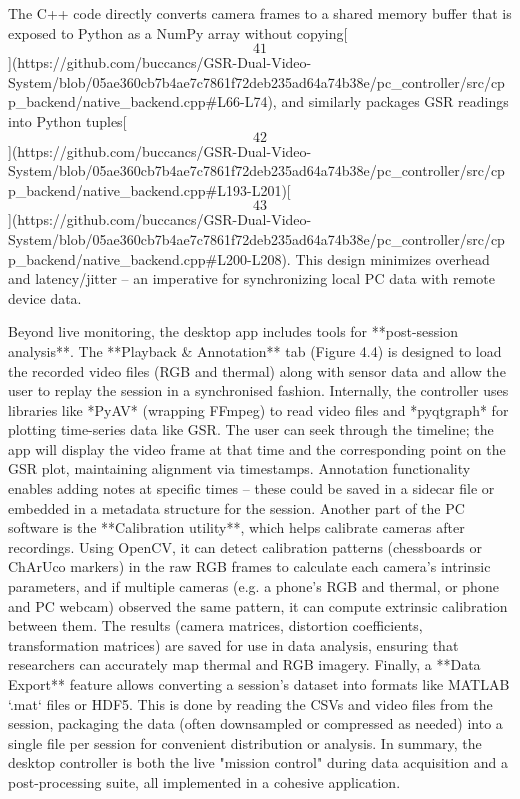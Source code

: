 \documentclass[12pt,a4paper]{article}
\begin{document}
{The C++ code directly converts camera frames to a shared memory buffer
that is exposed to Python as a NumPy array without
copying[\[41\]](https://github.com/buccancs/GSR-Dual-Video-System/blob/05ae360cb7b4ae7c7861f72deb235ad64a74b38e/pc_controller/src/cpp_backend/native_backend.cpp#L66-L74),
and similarly packages GSR readings into Python
tuples[\[42\]](https://github.com/buccancs/GSR-Dual-Video-System/blob/05ae360cb7b4ae7c7861f72deb235ad64a74b38e/pc_controller/src/cpp_backend/native_backend.cpp#L193-L201)[\[43\]](https://github.com/buccancs/GSR-Dual-Video-System/blob/05ae360cb7b4ae7c7861f72deb235ad64a74b38e/pc_controller/src/cpp_backend/native_backend.cpp#L200-L208).
This design minimizes overhead and latency/jitter -- an imperative for
synchronizing local PC data with remote device data.

Beyond live monitoring, the desktop app includes tools for
**post-session analysis**. The **Playback & Annotation** tab (Figure
4.4) is designed to load the recorded video files (RGB and thermal)
along with sensor data and allow the user to replay the session in a
synchronised fashion. Internally, the controller uses libraries like
*PyAV* (wrapping FFmpeg) to read video files and *pyqtgraph* for
plotting time-series data like GSR. The user can seek through the
timeline; the app will display the video frame at that time and the
corresponding point on the GSR plot, maintaining alignment via
timestamps. Annotation functionality enables adding notes at specific
times -- these could be saved in a sidecar file or embedded in a
metadata structure for the session. Another part of the PC software is
the **Calibration utility**, which helps calibrate cameras after
recordings. Using OpenCV, it can detect calibration patterns
(chessboards or ChArUco markers) in the raw RGB frames to calculate each
camera's intrinsic parameters, and if multiple cameras (e.g. a phone's
RGB and thermal, or phone and PC webcam) observed the same pattern, it
can compute extrinsic calibration between them. The results (camera
matrices, distortion coefficients, transformation matrices) are saved
for use in data analysis, ensuring that researchers can accurately map
thermal and RGB imagery. Finally, a **Data Export** feature allows
converting a session's dataset into formats like MATLAB `.mat` files or
HDF5. This is done by reading the CSVs and video files from the session,
packaging the data (often downsampled or compressed as needed) into a
single file per session for convenient distribution or analysis. In
summary, the desktop controller is both the live "mission control"
during data acquisition and a post-processing suite, all implemented in
a cohesive application.

}
\end{document}
